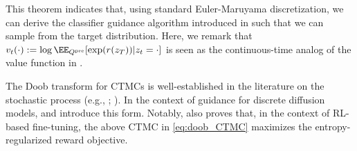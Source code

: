 This theorem indicates that, using standard Euler-Maruyama discretization, we can derive the classifier guidance algorithm introduced in  such that we can sample from the target distribution. Here, we remark that $v_t(\cdot):=\log \EE_{Q^{\pre}}[\exp(r(z_T))|z_t=\cdot] $ is seen as the continuous-time analog of the value function in . 

The Doob transform for CTMCs is well-established in the literature on the stochastic process (e.g., \citet[Chapter 17]{levin2017markov}; \citet[Chapter 3]{chetrite2015nonequilibrium}). In the context of guidance for discrete diffusion models, \citet{nisonoff2024unlocking} and \citet{wang2024finetuning} introduce this form. Notably, \citet{wang2024finetuning} also proves that, in the context of RL-based fine-tuning, the above CTMC in \eqref{eq:doob_CTMC} maximizes the entropy-regularized reward objective.














